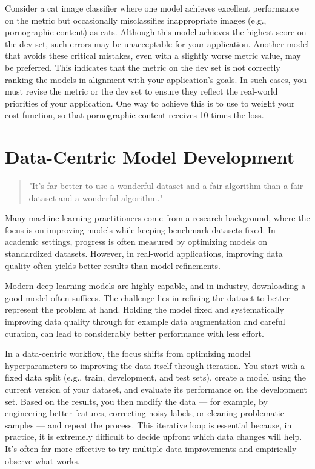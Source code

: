\documentclass[12pt,openany]{book}
\begin{document}
\begin{examplebox}
Consider a cat image classifier where one model achieves excellent performance on the metric but occasionally misclassifies inappropriate images (e.g., pornographic content) as cats. Although this model achieves the highest score on the dev set, such errors may be unacceptable for your application. Another model that avoids these critical mistakes, even with a slightly worse metric value, may be preferred. This indicates that the metric on the dev set is not correctly ranking the models in alignment with your application’s goals. In such cases, you must revise the metric or the dev set to ensure they reflect the real-world priorities of your application. One way to achieve this is to use to weight your cost function, so that pornographic content receives 10 times the loss. 
\end{examplebox}




\chapter{Data-Centric Model Development}

\begin{quote}
    "It's far better to use a wonderful dataset and a fair algorithm than a fair dataset and a wonderful algorithm."
\end{quote}

Many machine learning practitioners come from a research background, where the focus is on improving models while keeping benchmark datasets fixed. In academic settings, progress is often measured by optimizing models on standardized datasets. However, in real-world applications, improving data quality often yields better results than model refinements.
\newline

Modern deep learning models are highly capable, and in industry, downloading a good model often suffices. The challenge lies in refining the dataset to better represent the problem at hand. Holding the model fixed and systematically improving data quality through for example data augmentation and careful curation, can lead to considerably better performance with less effort.
\newline

In a data-centric workflow, the focus shifts from optimizing model hyperparameters to improving the data itself through iteration. You start with a fixed data split (e.g., train, development, and test sets), create a model using the current version of your dataset, and evaluate its performance on the development set. Based on the results, you then modify the data — for example, by engineering better features, correcting noisy labels, or cleaning problematic samples — and repeat the process.
This iterative loop is essential because, in practice, it is extremely difficult to decide upfront which data changes will help. It's often far more effective to try multiple data improvements and empirically observe what works.
\newline
\end{document}
